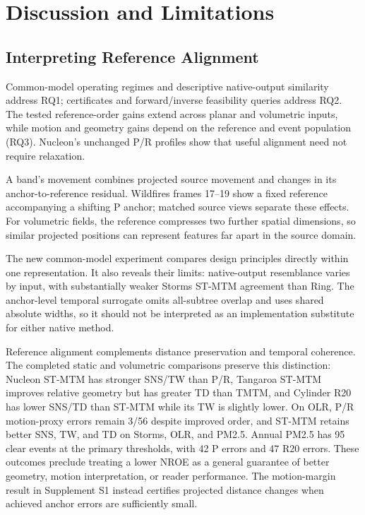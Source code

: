 \section{Discussion and Limitations}\label{sec:discussion}
\subsection{Interpreting Reference Alignment}
Common-model operating regimes and descriptive native-output similarity address RQ1; certificates and forward/inverse feasibility queries address RQ2. The tested reference-order gains extend across planar and volumetric inputs, while motion and geometry gains depend on the reference and event population (RQ3). Nucleon's unchanged P/R profiles show that useful alignment need not require relaxation.

A band's movement combines projected source movement and changes in its anchor-to-reference residual. Wildfires frames 17--19 show a fixed reference accompanying a shifting P anchor; matched source views separate these effects. For volumetric fields, the reference compresses two further spatial dimensions, so similar projected positions can represent features far apart in the source domain.

The new common-model experiment compares design principles directly within one representation. It also reveals their limits: native-output resemblance varies by input, with substantially weaker Storms ST-MTM agreement than Ring. The anchor-level temporal surrogate omits all-subtree overlap and uses shared absolute widths, so it should not be interpreted as an implementation substitute for either native method.

Reference alignment complements distance preservation and temporal coherence. The completed static and volumetric comparisons preserve this distinction: Nucleon ST-MTM has stronger SNS/TW than P/R, Tangaroa ST-MTM improves relative geometry but has greater TD than TMTM, and Cylinder R20 has lower SNS/TD than ST-MTM while its TW is slightly lower. On OLR, P/R motion-proxy errors remain 3/56 despite improved order, and ST-MTM retains better SNS, TW, and TD on Storms, OLR, and PM2.5. Annual PM2.5 has 95 clear events at the primary thresholds, with 42 P errors and 47 R20 errors. These outcomes preclude treating a lower NROE as a general guarantee of better geometry, motion interpretation, or reader performance. The motion-margin result in Supplement S1 instead certifies projected distance changes when achieved anchor errors are sufficiently small.

